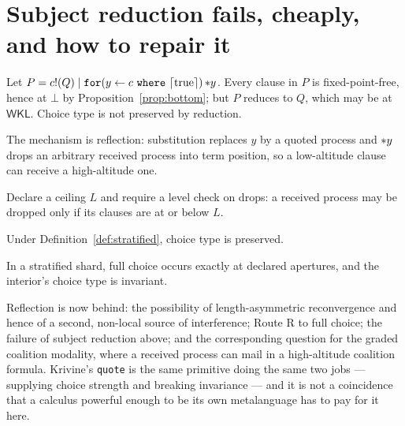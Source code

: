 \section{Subject reduction fails, cheaply, and how to repair it}
\label{sec:sr}

\begin{proposition}
\label{prop:srfail}
Let $P = c!(Q) \mid \texttt{for}(y \leftarrow c\ \texttt{where}\
\lceil \mathrm{true}\rceil)\,\drop{y}$. Every clause in $P$ is fixed-point-free,
hence at $\bot$ by Proposition~\ref{prop:bottom}; but $P$ reduces to $Q$, which may
be at $\mathsf{WKL}$. Choice type is not preserved by reduction.
\end{proposition}

The mechanism is reflection: substitution replaces $y$ by a quoted process and
${*}y$ drops an arbitrary received process into term position, so a
low-altitude clause can receive a high-altitude one.

\begin{definition}
\label{def:stratified}
Declare a ceiling $L$ and require a level check on drops: a received process may
be dropped only if its clauses are at or below $L$.
\end{definition}

\begin{proposition}
\label{prop:srfix}
Under Definition~\ref{def:stratified}, choice type is preserved.
\end{proposition}

\begin{corollary}
In a stratified shard, full choice occurs exactly at declared apertures, and the
interior's choice type is invariant.
\end{corollary}

\begin{remark}
Reflection is now behind: the possibility of length-asymmetric reconvergence and
hence of a second, non-local source of interference; Route R to full choice; the
failure of subject reduction above; and the corresponding question for the graded
coalition modality, where a received process can mail in a high-altitude coalition
formula. Krivine's \texttt{quote} is the same primitive doing the same two jobs ---
supplying choice strength and breaking invariance --- and it is not a coincidence
that a calculus powerful enough to be its own metalanguage has to pay for it here.
\end{remark}


